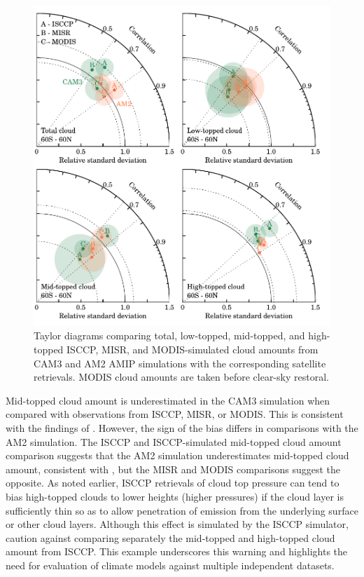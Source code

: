 \begin{figure}
    \centering
    \includegraphics{../graphics/cldtypes_cmip3amip_taylor.pdf} 
    \caption[Taylor diagrams comparing total, low-topped, mid-topped, and high-topped ISCCP, MISR, and MODIS-simulated cloud amounts from CAM3 and AM2 AMIP simulations with the corresponding satellite retrievals.]{Taylor diagrams comparing total, low-topped, mid-topped, and high-topped ISCCP, MISR, and MODIS-simulated cloud amounts from CAM3 and AM2 AMIP simulations with the corresponding satellite retrievals. MODIS cloud amounts are taken before clear-sky restoral.}
    \label{cldtypes_cmip3amip_taylor}
\end{figure}

Mid-topped cloud amount is underestimated in the CAM3 simulation when compared with observations from ISCCP, MISR, or MODIS. This is consistent with the findings of \cite{zhang_et_al_2005}. However, the sign of the bias differs in comparisons with the AM2 simulation. The ISCCP and ISCCP-simulated mid-topped cloud amount comparison suggests that the AM2 simulation underestimates mid-topped cloud amount, consistent with \cite{zhang_et_al_2005}, but the MISR and MODIS comparisons suggest the opposite. As noted earlier, ISCCP retrievals of cloud top pressure can tend to bias high-topped clouds to lower heights (higher pressures) if the cloud layer is sufficiently thin so as to allow penetration of emission from the underlying surface or other cloud layers. Although this effect is simulated by the ISCCP simulator, \cite{marchand_and_ackerman_2010} caution against comparing separately the mid-topped and high-topped cloud amount from ISCCP. This example underscores this warning and highlights the need for evaluation of climate models against multiple independent datasets.

